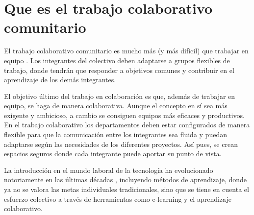 \section{Que es el trabajo colaborativo comunitario}

El trabajo colaborativo comunitario es mucho más (y más difícil) que trabajar en equipo \cite{rob}. Los integrantes del colectivo deben adaptarse a grupos flexibles de trabajo, donde tendrán que responder a objetivos comunes y contribuir en el aprendizaje de los demás integrantes. 

El objetivo último del trabajo en colaboración es que, además de trabajar en equipo, se haga de manera colaborativa. Aunque el concepto en sí sea más exigente y ambicioso, a cambio se consiguen equipos más eficaces y productivos. En el trabajo colaborativo los departamentos deben estar configurados de manera flexible para que la comunicación entre los integrantes sea fluida y puedan adaptarse según las necesidades de los diferentes proyectos. Así pues, se crean espacios seguros donde cada integrante puede aportar su punto de vista. 

La introducción en el mundo laboral de la tecnología ha evolucionado notoriamente en las últimas décadas \cite{canal}, incluyendo métodos de aprendizaje, donde ya no se valora las metas individuales tradicionales, sino que se tiene en cuenta el esfuerzo colectivo a través de herramientas como e-learning y el aprendizaje colaborativo.
